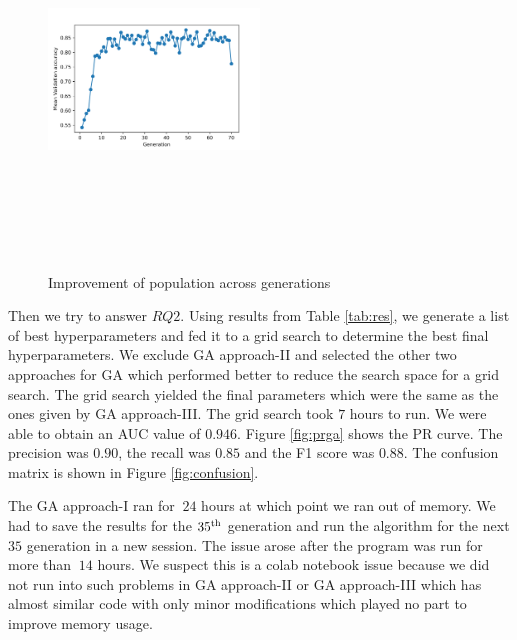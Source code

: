 \documentclass[conference]{IEEEtran}
\begin{document}
\begin{figure}
\includegraphics[width=0.5\textwidth, height=10cm, keepaspectratio]{genetic-type-3/genetic-type-3-all-gen.png}
\caption{Improvement of population across generations}
\label{fig:gmv}
\end{figure}

Then we try to answer $RQ2$. Using results from Table \ref{tab:res}, we generate a list of best hyperparameters and fed it to a grid search to determine the best final hyperparameters. We exclude GA approach-II and selected the other two approaches for GA which performed better to reduce the search space for a grid search. The grid search yielded the final parameters which were the same as the ones given by GA approach-III. The grid search took $7$ hours to run. We were able to obtain an AUC value of $0.946$. Figure \ref{fig:prga} shows the PR curve. The precision was $0.90$, the recall was $0.85$ and the F1 score was $0.88$. The confusion matrix is shown in Figure \ref{fig:confusion}.

The GA approach-I ran for $~24$ hours at which point we ran out of memory. We had to save the results for the $35\textsuperscript{th}$ generation and run the algorithm for the next $35$ generation in a new session. The issue arose after the program was run for more than $~14$ hours. We suspect this is a colab notebook issue because we did not run into such problems in GA approach-II or GA approach-III which has almost similar code with only minor modifications which played no part to improve memory usage. 
\end{document}
